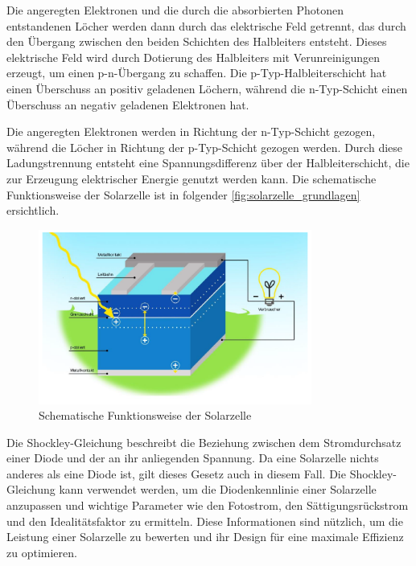 \documentclass[12pt,english,ngerman]{scrartcl}
\begin{document}
Die angeregten Elektronen und die durch die absorbierten Photonen entstandenen
Löcher werden dann durch das elektrische Feld getrennt, das durch den Übergang
zwischen den beiden Schichten des Halbleiters entsteht. Dieses elektrische Feld
wird durch Dotierung des Halbleiters mit Verunreinigungen erzeugt, um einen
p-n-Übergang zu schaffen. Die p-Typ-Halbleiterschicht hat einen Überschuss an
positiv geladenen Löchern, während die n-Typ-Schicht einen Überschuss an
negativ geladenen Elektronen hat.

Die angeregten Elektronen werden in Richtung der n-Typ-Schicht gezogen, während
die Löcher in Richtung der p-Typ-Schicht gezogen werden. Durch diese
Ladungstrennung entsteht eine Spannungsdifferenz über der Halbleiterschicht,
die zur Erzeugung elektrischer Energie genutzt werden kann. Die schematische 
Funktionsweise der Solarzelle ist in folgender \autoref{fig:solarzelle_grundlagen} ersichtlich.

\begin{figure}[H]
	\begin{center}
		\includegraphics[width =0.8\textwidth]{./figures/solarzelle_grundlagen.PNG}
	\end{center}
	\caption[Schematische Funktionsweise der Solarzelle]{Schematische Funktionsweise der Solarzelle
	\cite{unterlagen_solarzelle}}\label{fig:solarzelle_grundlagen}
\end{figure}

Die Shockley-Gleichung beschreibt die Beziehung zwischen dem Stromdurchsatz
einer Diode und der an ihr anliegenden Spannung. Da eine Solarzelle nichts
anderes als eine Diode ist, gilt dieses Gesetz auch in diesem Fall. Die
Shockley-Gleichung kann verwendet werden, um die Diodenkennlinie einer
Solarzelle anzupassen und wichtige Parameter wie den Fotostrom, den
Sättigungsrückstrom und den Idealitätsfaktor zu ermitteln. Diese Informationen
sind nützlich, um die Leistung einer Solarzelle zu bewerten und ihr Design für
eine maximale Effizienz zu optimieren.
\end{document}
